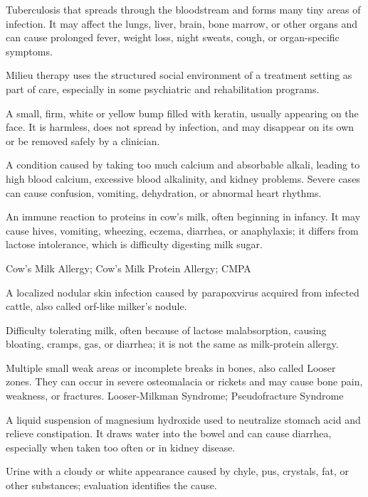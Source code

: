  Tuberculosis that spreads through the bloodstream and forms many tiny areas of infection. It may affect the lungs, liver, brain, bone marrow, or other organs and can cause prolonged fever, weight loss, night sweats, cough, or organ-specific symptoms.

 Milieu therapy uses the structured social environment of a treatment setting as part of care, especially in some psychiatric and rehabilitation programs.

 A small, firm, white or yellow bump filled with keratin, usually appearing on the face. It is harmless, does not spread by infection, and may disappear on its own or be removed safely by a clinician.

 A condition caused by taking too much calcium and absorbable alkali, leading to high blood calcium, excessive blood alkalinity, and kidney problems. Severe cases can cause confusion, vomiting, dehydration, or abnormal heart rhythms.

 An immune reaction to proteins in cow's milk, often beginning in infancy. It may cause hives, vomiting, wheezing, eczema, diarrhea, or anaphylaxis; it differs from lactose intolerance, which is difficulty digesting milk sugar.

\synonyms
Cow's Milk Allergy; Cow's Milk Protein Allergy; CMPA

 A localized nodular skin infection caused by parapoxvirus acquired from infected cattle, also called orf-like milker's nodule.

 Difficulty tolerating milk, often because of lactose malabsorption, causing bloating, cramps, gas, or diarrhea; it is not the same as milk-protein allergy.

 Multiple small weak areas or incomplete breaks in bones, also called Looser zones. They can occur in severe osteomalacia or rickets and may cause bone pain, weakness, or fractures.
\synonyms
Looser-Milkman Syndrome; Pseudofracture Syndrome

 A liquid suspension of magnesium hydroxide used to neutralize stomach acid and relieve constipation. It draws water into the bowel and can cause diarrhea, especially when taken too often or in kidney disease.

 Urine with a cloudy or white appearance caused by chyle, pus, crystals, fat, or other substances; evaluation identifies the cause.

